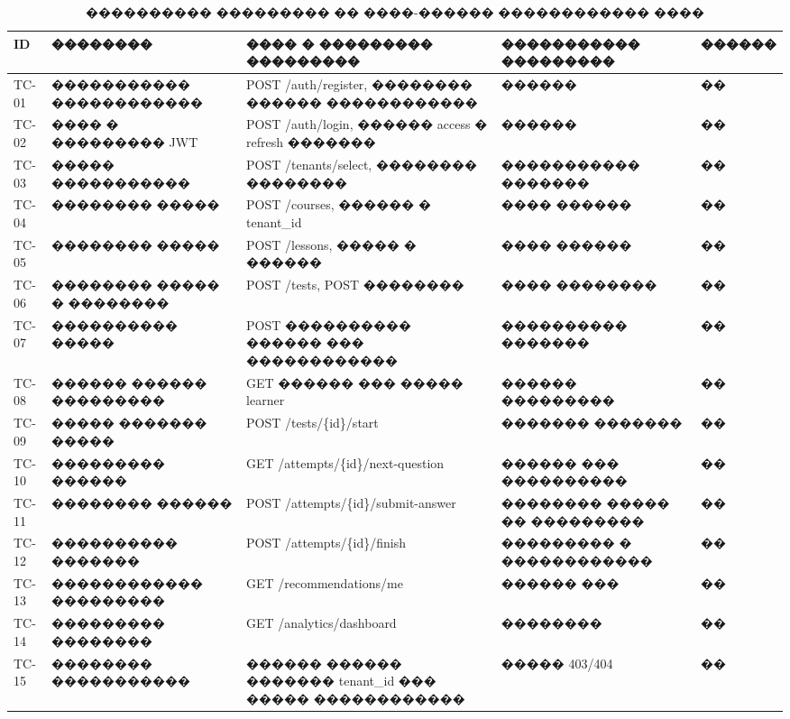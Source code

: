\begin{table}[H]
\centering
\caption{���������� ��������� �� ����-������ ������������ ����}
\label{tab:appb-tests}
{\fontsize{11pt}{13pt}\selectfont
\setlength{\tabcolsep}{3pt}
\begin{tabularx}{\textwidth}{|>{\centering\arraybackslash}p{10mm}|>{\RaggedRight\arraybackslash}p{38mm}|>{\RaggedRight\arraybackslash}X|>{\RaggedRight\arraybackslash}p{28mm}|>{\centering\arraybackslash}p{18mm}|}
\hline
ID & �������� & ���� � ��������� ��������� & ����������� ��������� & ������ \\
\hline
TC-01 & ����������� ������������ & POST /auth/register, �������� ������ ������������ & ������ & �� \\
\hline
TC-02 & ���� � ��������� JWT & POST /auth/login, ������ access � refresh ������� & ������ & �� \\
\hline
TC-03 & ����� ����������� & POST /tenants/select, �������� �������� & ����������� ������� & �� \\
\hline
TC-04 & �������� ����� & POST /courses, ������ � tenant\_id & ���� ������ & �� \\
\hline
TC-05 & �������� ����� & POST /lessons, ����� � ������ & ���� ������ & �� \\
\hline
TC-06 & �������� ����� � �������� & POST /tests, POST �������� & ���� �������� & �� \\
\hline
TC-07 & ���������� ����� & POST ���������� ������ ��� ������������ & ���������� ������� & �� \\
\hline
TC-08 & ������ ������ ��������� & GET ������ ��� ����� learner & ������ ��������� & �� \\
\hline
TC-09 & ����� ������� ����� & POST /tests/\{id\}/start & ������� ������� & �� \\
\hline
TC-10 & ��������� ������ & GET /attempts/\{id\}/next-question & ������ ��� ���������� & �� \\
\hline
TC-11 & �������� ������ & POST /attempts/\{id\}/submit-answer & �������� ����� �� ��������� & �� \\
\hline
TC-12 & ���������� ������� & POST /attempts/\{id\}/finish & ��������� � ������������ & �� \\
\hline
TC-13 & ������������ ��������� & GET /recommendations/me & ������ ��� & �� \\
\hline
TC-14 & ��������� �������� & GET /analytics/dashboard & �������� & �� \\
\hline
TC-15 & �������� ����������� & ������ ������ ������� tenant\_id ��� ����� ������������ & ����� 403/404 & �� \\

\end{tabularx}}
\end{table}
